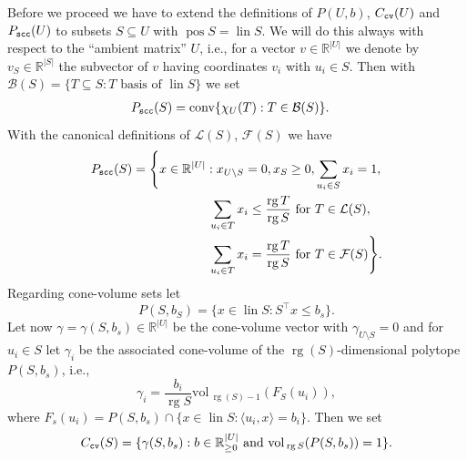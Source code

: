 \documentclass[11pt, a4paper, twoside, reqno]{amsart}
\DeclareMathOperator*{\pos}{pos}
\DeclareMathOperator*{\lin}{lin}
\DeclareMathOperator*{\rg}{rg}
\DeclareMathOperator*{\conv}{conv}
\newcommand{\R}{\mathbb{R}}
\theoremstyle{definition}
\theoremstyle{remark}
\newcommand{\vol}{\mathrm{vol}\,}
\newcommand{\scc}{{\tt scc}}
\newcommand{\cv}{{\tt cv}}
\numberwithin{equation}{section}
\begin{document}
Before we proceed we have to extend the definitions of
$P(U,b)$, $C_\cv(U)$ and $P_\scc(U)$ to subsets $S\subseteq U$
with $\pos S=\lin S$. We will do this always with respect to the
``ambient matrix'' $U$, i.e., for a vector $v\in\R^{|U|}$ we denote by
$v_S\in\R^{|S|}$ the subvector of $v$ having coordinates $v_i$ with $u_i\in S$.
Then with $\mathcal{B}(S)=\{T\subseteq S: T \text{ basis of }\lin S\}$
we set
\begin{equation*}
  \begin{split}
    P_\scc(S) &=\conv\{\chi_U(T) : T\in \mathcal{B}(S) \}.
  \end{split}
\end{equation*}
With the canonical definitions of $\mathcal{L}(S)$, $\mathcal{F}(S)$
we have
\begin{equation*}
  \begin{split}
    P_\scc(S) & =\Bigg \{ x \in\R^{|U|} : x_{U\setminus S}=0, x_S\geq 0, \sum_{u_i\in
      S}x_i=1,\\
    &\quad\quad\quad  \quad\quad\quad\sum_{u_i\in T} x_i\leq \frac{\rg T}{\rg S} \text{ for }
    T\in\mathcal{L}(S),\\
     &\quad\quad\quad \quad\quad\quad \sum_{u_i\in T} x_i= \frac{\rg T}{\rg S} \text{ for }
    T\in\mathcal{F}(S) \Bigg \}.
  \end{split}
\end{equation*}
Regarding cone-volume sets let
\begin{equation*}
   P(S,b_S)=\{x\in\lin S: S^\intercal x\leq b_s\}.
 \end{equation*}
Let now $\gamma=\gamma(S,b_s)\in\R^{|U|}$  be the cone-volume vector
with $\gamma_{U\setminus S}=0$ and for $u_i\in S$ let $\gamma_i$ be
the associated cone-volume of the $\rg(S)$-dimensional polytope $P(S,b_s)$,
i.e.,
\begin{equation*}
        \gamma_i=\frac{b_i}{\rg S}\vol_{\rg(S)-1}(F_S(u_i)),
\end{equation*}
where $F_s(u_i)=P(S,b_s)\cap\{x\in\lin S : \langle u_i,x\rangle
=b_i\}$. Then we set
\begin{equation*}
  C_\cv(S)=\{\gamma(S,b_s) : b\in\R^{|U|}_{\geq 0} \text{ and }\vol_{\rg S}(P(S,b_s))=1\}.
\end{equation*}
\end{document}
